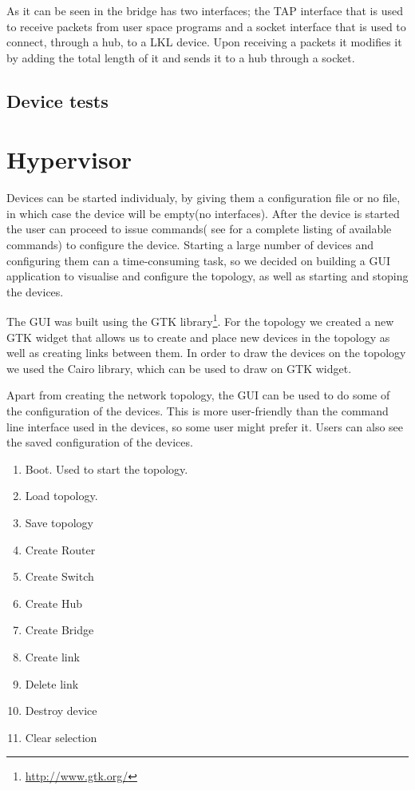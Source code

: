
As it can be seen in  the bridge has two interfaces; the TAP interface that is used to 
receive packets from user space programs and a socket interface that is used to connect, through a hub, to 
a LKL device. Upon receiving a packets it modifies it by adding the total length of it and sends it to a hub 
through a socket.

\subsection{Device tests}
\label{sub-sec:bridge-tests}

\section{Hypervisor}
\label{sec:hypervisor2}

Devices can be started individualy, by giving them a configuration file or no file, in which case the device
will be empty(no interfaces). After the device is started the user can proceed to issue commands( see  
for a complete listing of available commands) to configure the device. Starting a large number of
devices and configuring them can a time-consuming task, so we decided on building a GUI application to visualise and configure
the topology, as well as starting and stoping the devices.



The GUI was built using the GTK library\footnote{\url{http://www.gtk.org/}}. For the topology we created a new GTK widget
that allows us to create and place new devices in the topology as well as creating links between them. In order to draw
the devices on the topology we used the Cairo library, which can be used to draw on GTK widget.

Apart from creating the network topology, the GUI can be used to do some of the configuration of the devices. This is 
more user-friendly than the command line interface used in the devices, so some user might prefer it. Users can also see
the saved configuration of the devices.

\begin{enumerate}
  \item Boot. Used to start the topology. 
  \item Load topology. 
  \item Save topology
  \item Create Router
  \item Create Switch
  \item Create Hub
  \item Create Bridge
  \item Create link
  \item Delete link
  \item Destroy device
  \item Clear selection
\end{enumerate}

